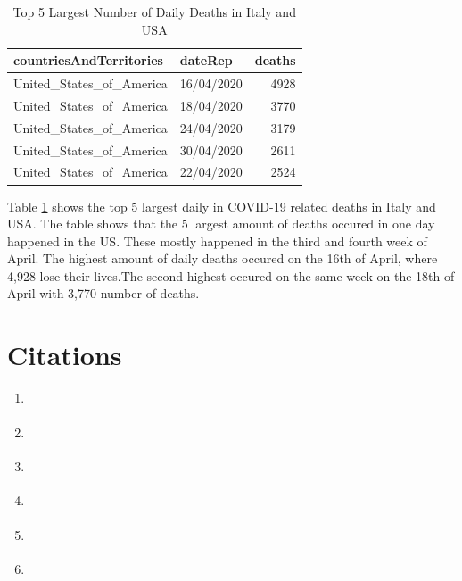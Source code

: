 \documentclass[11pt,a4paper,]{article}
\providecommand{\tightlist}{%
  \setlength{\itemsep}{0pt}\setlength{\parskip}{0pt}}
\begin{document}
\clearpage

\begin{table}

\caption{\label{tab:death-table}Top 5 Largest Number of Daily Deaths in Italy and USA}
\centering
\begin{tabular}[t]{l|l|r}
\hline
countriesAndTerritories & dateRep & deaths\\
\hline
United\_States\_of\_America & 16/04/2020 & 4928\\
\hline
United\_States\_of\_America & 18/04/2020 & 3770\\
\hline
United\_States\_of\_America & 24/04/2020 & 3179\\
\hline
United\_States\_of\_America & 30/04/2020 & 2611\\
\hline
United\_States\_of\_America & 22/04/2020 & 2524\\
\hline
\end{tabular}
\end{table}

Table \ref{tab:death-table} shows the top 5 largest daily in COVID-19 related deaths in Italy and USA. The table shows that the 5 largest amount of deaths occured in one day happened in the US. These mostly happened in the third and fourth week of April. The highest amount of daily deaths occured on the 16th of April, where 4,928 lose their lives.The second highest occured on the same week on the 18th of April with 3,770 number of deaths.

\clearpage

\hypertarget{citations}{%
\section{Citations}\label{citations}}

\begin{enumerate}
\def\labelenumi{\arabic{enumi}.}
\tightlist
\item
  \textcite{tidyverse}
\item
  \textcite{readr}
\item
  \textcite{KableExtra}
\item
  \textcite{bookdown}
\item
  \textcite{bookdown2}
\item
  \textcite{lubridate}
\end{enumerate}

\clearpage

\printbibliography
\end{document}
